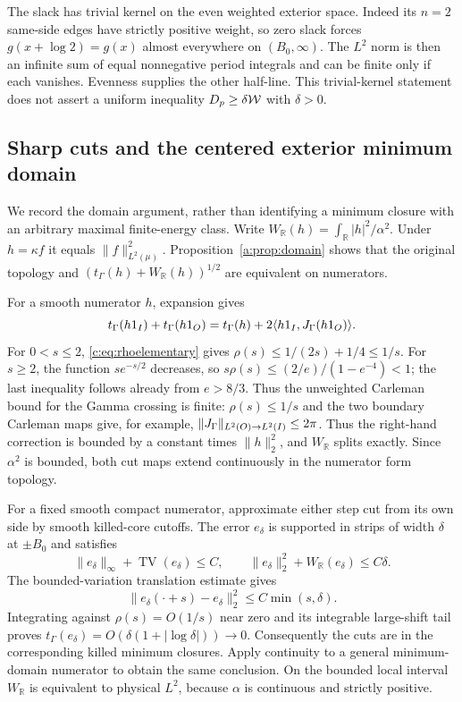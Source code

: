 \documentclass[11pt,a4paper]{article}
\numberwithin{equation}{section}
\theoremstyle{definition}\newtheorem{definition}[theorem]{Definition}
\theoremstyle{remark}\newtheorem{remark}[theorem]{Remark}
\newcommand{\R}{\mathbb R}\newcommand{\C}{\mathbb C}\newcommand{\N}{\mathbb N}
\newcommand{\ip}[2]{\langle#1,#2\rangle}\newcommand{\norm}[1]{\lVert#1\rVert}\newcommand{\abs}[1]{\lvert#1\rvert}
\begin{document}
The slack has trivial kernel on the even weighted exterior space.
Indeed its $n=2$ same-side edges have strictly positive weight, so
zero slack forces $g(x+\log2)=g(x)$ almost everywhere on $({B_0},\infty)$.
The $L^2$ norm is then an infinite sum of equal nonnegative period
integrals and can be finite only if each vanishes. Evenness supplies
the other half-line. This trivial-kernel statement does not assert a
uniform inequality $D_p\ge\delta\mathcal W$ with $\delta>0$.


\subsection{Sharp cuts and the centered exterior minimum domain}\label{c:app:cuts}
We record the domain argument, rather than identifying a minimum
closure with an arbitrary maximal finite-energy class.
Write $W_\R(h)=\int_\R |h|^2/\alpha^2$. Under $h=\kappa f$ it equals
$\norm f_{L^2(\mu)}^2$. Proposition~\ref{a:prop:domain}
shows that the original topology and
$(t_\Gamma(h)+W_\R(h))^{1/2}$ are equivalent on numerators.

For a smooth numerator $h$, expansion gives
\[
 t_\Gamma(h1_I)+t_\Gamma(h1_O)
 =t_\Gamma(h)+2\ip{h1_I}{\J_\Gamma(h1_O)}.
\]
For $0<s\le2$, \eqref{c:eq:rhoelementary} gives
$\rho(s)\le1/(2s)+1/4\le1/s$. For $s\ge2$, the function
$se^{-s/2}$ decreases, so
$s\rho(s)\le(2/e)/(1-e^{-4})<1$; the last inequality follows already
from $e>8/3$. Thus the unweighted Carleman bound for the Gamma crossing
is finite: $\rho(s)\le1/s$ and the two boundary Carleman maps give,
for example, $\norm{\J_\Gamma}_{L^2(O)\to L^2(I)}\le2\pi$.
Thus the right-hand correction is bounded by a constant times
$\norm h_2^2$, and $W_\R$ splits exactly. Since $\alpha^2$ is bounded,
both cut maps extend continuously in the numerator form topology.

For a fixed smooth compact numerator, approximate either step cut from
its own side by smooth killed-core cutoffs. The error $e_\delta$ is
supported in strips of width $\delta$ at $\pm {B_0}$ and satisfies
\[
 \norm{e_\delta}_\infty+\operatorname{TV}(e_\delta)\le C,
 \qquad\norm{e_\delta}_2^2+W_\R(e_\delta)\le C\delta.
\]
The bounded-variation translation estimate gives
\[
 \norm{e_\delta(\cdot+s)-e_\delta}_2^2\le C\min(s,\delta).
\]
Integrating against $\rho(s)=O(1/s)$ near zero and its integrable
large-shift tail proves
$t_\Gamma(e_\delta)=O(\delta(1+|\log\delta|))\to0$.
Consequently the cuts are in the corresponding killed minimum closures.
Apply continuity to a general minimum-domain numerator to obtain the
same conclusion. On the bounded local interval $W_\R$ is equivalent
to physical $L^2$, because $\alpha$ is continuous and strictly positive.
\end{document}
